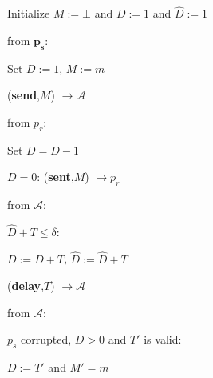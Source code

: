 \begin{bbox}[title={$\F_{\msf{BD-SEC}}^{\delta,\ell}(p_s,p_r)$}]

Initialize $M := \bot$ and $D := 1$ and $\hat{D} := 1$

\OnInput {} from $\mathbf{p_s}$:

	\quad Set $D := 1$, $M := m$

	\quad \Leak ({\bf send},$M$) $\rightarrow \mathcal{A}$

\OnInput {} from $p_r$:

	\quad Set $D = D - 1$

	\quad \If $D = 0$: \Send ({\bf sent},$M$) $\rightarrow p_r$

\OnInput {} from $\mathcal{A}$:

	\quad \If $\hat{D} + T \leq \delta$: 

		\quad \quad $D := D + T$, $\hat{D} := \hat{D} + T$

		\quad \quad \Send ({\bf delay},$T$) $\rightarrow \mathcal{A}$

\OnInput {} from $\mathcal{A}$:

	\quad \If $p_s$ corrupted, $D > 0$ and $T'$ is valid:

		\quad \quad $D := T'$ and $M' = m$


\end{bbox}

